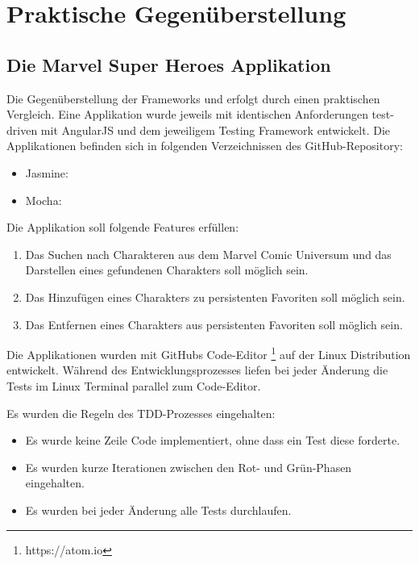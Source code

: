 \newpage
\section{Praktische Gegenüberstellung}

\subsection{Die Marvel Super Heroes Applikation}
Die Gegenüberstellung der Frameworks  und  erfolgt durch einen praktischen Vergleich. Eine Applikation wurde jeweils mit identischen Anforderungen test-driven mit AngularJS und dem jeweiligem Testing Framework entwickelt.
Die Applikationen befinden sich in folgenden Verzeichnissen des GitHub-Repository:
\begin{itemize}
  \item Jasmine: 
  \item Mocha: 
\end{itemize}

Die Applikation  soll folgende Features erfüllen:

\begin{enumerate}
 \item Das Suchen nach Charakteren aus dem Marvel Comic Universum und das Darstellen eines gefundenen Charakters soll möglich sein.
 \item Das Hinzufügen eines Charakters zu persistenten Favoriten soll möglich sein.
 \item Das Entfernen eines Charakters aus persistenten Favoriten soll möglich sein.
\end{enumerate}

Die Applikationen wurden mit GitHubs Code-Editor \footnote{https://atom.io} auf der Linux Distribution  entwickelt. Während des Entwicklungsprozesses liefen bei jeder Änderung die Tests im Linux Terminal parallel zum Code-Editor.

Es wurden die Regeln des TDD-Prozesses eingehalten:
\begin{itemize}
  \item Es wurde keine Zeile Code implementiert, ohne dass ein Test diese forderte.
  \item Es wurden kurze Iterationen zwischen den Rot- und Grün-Phasen eingehalten.
  \item Es wurden bei jeder Änderung alle Tests durchlaufen.
\end{itemize}

